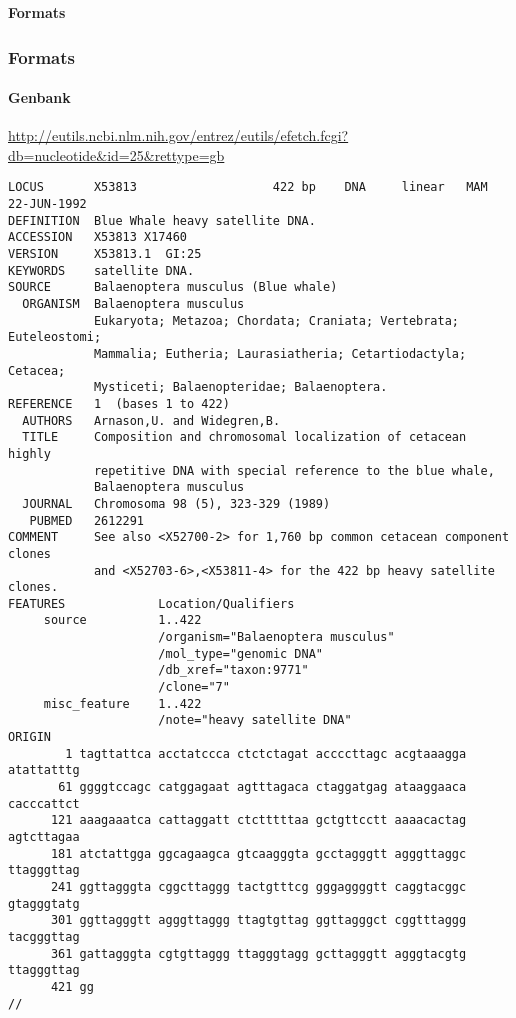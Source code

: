 \documentclass{beamer}
\newcommand{\centeredtitle}[1]{
\begin{center}
    \Huge{\bf{#1}}
\end{center}
}
\newcommand{\hugeslide}[1]{
\begin{frame}
\centeredtitle{#1}
\end{frame}
}
\begin{document}
\hugeslide{Formats}

\begin{frame}[fragile]
\frametitle{Formats}
\framesubtitle{Genbank}
\url{http://eutils.ncbi.nlm.nih.gov/entrez/eutils/efetch.fcgi?db=nucleotide&id=25&rettype=gb}
\begin{lstlisting}[basicstyle=\tiny,breaklines=false]
LOCUS       X53813                   422 bp    DNA     linear   MAM 22-JUN-1992
DEFINITION  Blue Whale heavy satellite DNA.
ACCESSION   X53813 X17460
VERSION     X53813.1  GI:25
KEYWORDS    satellite DNA.
SOURCE      Balaenoptera musculus (Blue whale)
  ORGANISM  Balaenoptera musculus
            Eukaryota; Metazoa; Chordata; Craniata; Vertebrata; Euteleostomi;
            Mammalia; Eutheria; Laurasiatheria; Cetartiodactyla; Cetacea;
            Mysticeti; Balaenopteridae; Balaenoptera.
REFERENCE   1  (bases 1 to 422)
  AUTHORS   Arnason,U. and Widegren,B.
  TITLE     Composition and chromosomal localization of cetacean highly
            repetitive DNA with special reference to the blue whale,
            Balaenoptera musculus
  JOURNAL   Chromosoma 98 (5), 323-329 (1989)
   PUBMED   2612291
COMMENT     See also <X52700-2> for 1,760 bp common cetacean component clones
            and <X52703-6>,<X53811-4> for the 422 bp heavy satellite clones.
FEATURES             Location/Qualifiers
     source          1..422
                     /organism="Balaenoptera musculus"
                     /mol_type="genomic DNA"
                     /db_xref="taxon:9771"
                     /clone="7"
     misc_feature    1..422
                     /note="heavy satellite DNA"
ORIGIN      
        1 tagttattca acctatccca ctctctagat accccttagc acgtaaagga atattatttg
       61 ggggtccagc catggagaat agtttagaca ctaggatgag ataaggaaca cacccattct
      121 aaagaaatca cattaggatt ctctttttaa gctgttcctt aaaacactag agtcttagaa
      181 atctattgga ggcagaagca gtcaagggta gcctagggtt agggttaggc ttagggttag
      241 ggttagggta cggcttaggg tactgtttcg gggaggggtt caggtacggc gtagggtatg
      301 ggttagggtt agggttaggg ttagtgttag ggttagggct cggtttaggg tacgggttag
      361 gattagggta cgtgttaggg ttagggtagg gcttagggtt agggtacgtg ttagggttag
      421 gg
//
\end{lstlisting}
\end{frame}
\end{document}
